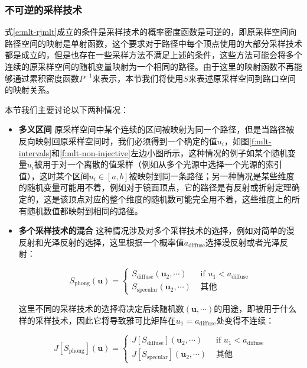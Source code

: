 \subsubsection{不可逆的采样技术}
式\ref{e:mlt-rjmlt}成立的条件是采样技术的概率密度函数是可逆的，即原采样空间向路径空间的映射是单射函数，这个要求对于路径中每个顶点使用的大部分采样技术都是成立的，但是也存在一些采样方法不满足上述的条件，这些方法可能会将多个连续的原采样空间的随机变量映射为一个相同的路径。由于这里的映射函数不再能够通过累积密度函数$P^{-1}$来表示，本节我们将使用$S$来表述原采样空间到路口空间的映射关系。

本节我们主要讨论以下两种情况：

\begin{itemize}
	\item \textbf{多义区间 }原采样空间中某个连续的区间被映射为同一个路径，但是当路径被反向映射回原采样空间时，我们必须得到一个确定的值$u_i$，如图\ref{f:mlt-intervals}和\ref{f:mlt-non-injective}左边小图所示，这种情况的例子如某个随机变量$u_i$被用于对一个离散的值采样（例如从多个光源中选择一个光源的索引值），这时某个区间$u_i\in[a,b]$被映射到同一条路径；另一种情况是某些维度的随机变量可能用不着，例如对于镜面顶点，它的路径是有反射或折射定理确定的，这是该顶点对应的整个维度的随机数可能完全用不着，这些维度上的所有随机数值都映射到相同的路径。
	\item \textbf{多个采样技术的混合 }这种情况涉及对多个采样技术的选择，例如对简单的漫反射和光泽反射的选择，这里根据一个概率值$a_{\text{diffuse}}$选择漫反射或者光泽反射：
	
	\begin{equation}
		S_{\text{phong}}(\mathbf{u})=\begin{cases}
			S_{\text{diffuse}}(\mathbf{u}_2,\cdots) & \text{ if } u_1<a_{\text{diffuse}}\\
			S_{\text{specular}}(\mathbf{u}_2,\cdots) & \text{  其他 }
		\end{cases}
	\end{equation}
	
	\noindent 这里不同的采样技术的选择将决定后续随机数$(\mathbf{u},\cdots)$的用途，即被用于什么样的采样技术，因此它将导致雅可比矩阵在$u_1=a_{\text{diffuse}}$处变得不连续：
	
	\begin{equation}
		J[S_{\text{phong}}](\mathbf{u})=\begin{cases}
			J[S_{\text{diffuse}}](\mathbf{u}_2,\cdots) & \text{ if } u_1<a_{\text{diffuse}}\\
			J[S_{\text{specular}}](\mathbf{u}_2,\cdots) & \text{  其他 }
		\end{cases}
	\end{equation}
\end{itemize}

